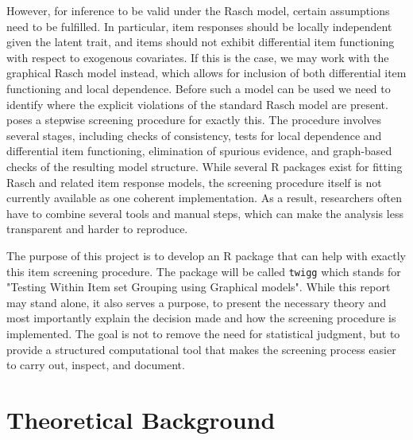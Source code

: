\documentclass[a4project,12pt]{article}
\theoremstyle{examplestyle}
\theoremstyle{defstyle}
\theoremstyle{thmstyle}
\begin{document}
However, for inference to be valid under the Rasch model, certain assumptions need to be fulfilled. In particular, item responses should be locally independent given the latent trait, and items should not exhibit differential item functioning with respect to exogenous covariates. If this is the case, we may work with the graphical Rasch model instead, which allows for inclusion of both differential item functioning and local dependence. Before such a model can be used we need to identify where the explicit violations of the standard Rasch model are present. \cite{kreiner-christensen-2011} poses a stepwise screening procedure for exactly this. The procedure involves several stages, including checks of consistency, tests for local dependence and differential item functioning, elimination of spurious evidence, and graph-based checks of the resulting model structure. While several R packages exist for fitting Rasch and related item response models, the screening procedure itself is not currently available as one coherent implementation. As a result, researchers often have to combine several tools and manual steps, which can make the analysis less transparent and harder to reproduce.

The purpose of this project is to develop an R package that can help with exactly this item screening procedure. The package will be called \texttt{twigg} which stands for "Testing Within Item set Grouping using Graphical models". While this report may stand alone, it also serves a purpose, to present the necessary theory and most importantly explain the decision made and how the screening procedure is implemented. The goal is not to remove the need for statistical judgment, but to provide a structured computational tool that makes the screening process easier to carry out, inspect, and document.

\section{Theoretical Background}
\end{document}
